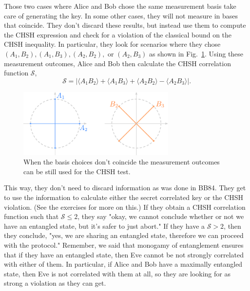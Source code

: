 Those two cases where Alice and Bob chose the same measurement basis take care of generating the key. In some other cases, they will not measure in bases that coincide. They don't discard these results, but instead  use them to compute the CHSH expression and check for a violation of the classical bound on the CHSH inequality. In particular, they look for scenarios where they chose $(A_1,B_2), (A_1,B_3), (A_2,B_2),$ or $(A_2,B_3)$ as shown in Fig.~\ref{fig:10-3_e91_example_CHSH}.
Using these measurement outcomes, Alice and Bob then calculate the CHSH correlation function $\mathcal{S}$,
\begin{equation}
    \mathcal{S} = |\langle A_1B_2\rangle + \langle A_1B_3\rangle + \langle A_2B_2\rangle - \langle A_2B_3\rangle|.
\end{equation}
\begin{figure}[t]
    \centering
    \includegraphics[width=0.7\textwidth]{lesson10/10-3_bases_CHSH.pdf}
    \caption[E91 - CHSH bases]{When the basis choices don't coincide the measurement outcomes can be still used for the CHSH test.}
    \label{fig:10-3_e91_example_CHSH}
\end{figure}

This way, they don't need to discard information as was done in BB84. They get to use the information to calculate either the secret correlated key or the CHSH violation. (See the exercises for more on this.) If they obtain a CHSH correlation function such that $\mathcal{S} \leq 2$, they say "okay, we cannot conclude whether or not we have an entangled state, but it's safer to just abort."  If they have a $\mathcal{S} > 2$, then they conclude, "yes, we are sharing an entangled state, therefore we can proceed with the protocol." Remember, we said that monogamy of entanglement ensures that if they have an entangled state, then Eve cannot be not strongly correlated with either of them.  In particular, if Alice and Bob have a maximally entangled state, then Eve is not correlated with them at all, so they are looking for as strong a violation as they can get.

